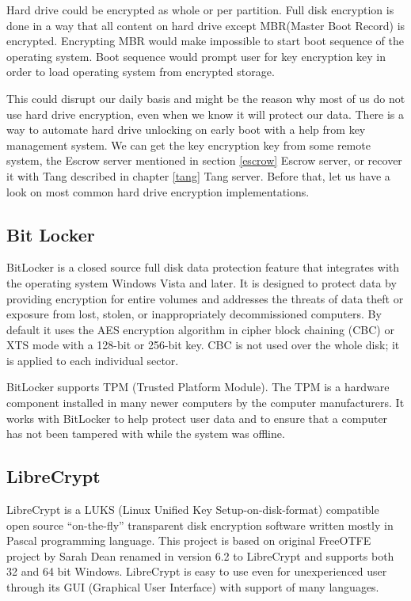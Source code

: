 Hard drive could be encrypted as whole or per partition.
Full disk encryption is done in a way that all content on hard drive except MBR(Master Boot Record) is encrypted.
Encrypting MBR would make impossible to start boot sequence of the operating system.
Boot sequence would prompt user for key encryption key in order to load operating system from encrypted storage.

This could disrupt our daily basis and might be the reason why most of us do not use hard drive encryption, even when we know it will protect our data.
There is a way to automate hard drive unlocking on early boot with a help from key management system.
We can get the key encryption key from some remote system, the Escrow server mentioned in section \ref{escrow} Escrow server, or recover it with Tang described in chapter \ref{tang} Tang server.
Before that, let us have a look on most common hard drive encryption implementations.

\subsection{Bit Locker}
BitLocker is a closed source full disk data protection feature that integrates with the operating system Windows Vista and later.
It is designed to protect data by providing encryption for entire volumes and addresses the threats of data theft or exposure from lost, stolen, or inappropriately decommissioned computers.
By default it uses the AES encryption algorithm in cipher block chaining (CBC) or XTS mode with a 128-bit or 256-bit key.
CBC is not used over the whole disk; it is applied to each individual sector.

BitLocker supports TPM (Trusted Platform Module).
The TPM is a hardware component installed in many newer computers by the computer manufacturers.
It works with BitLocker to help protect user data and to ensure that a computer has not been tampered with while the system was offline\cite{bitlocker}.

\subsection{LibreCrypt}

LibreCrypt is a LUKS (Linux Unified Key Setup-on-disk-format) compatible open source “on-the-fly” transparent disk encryption software written mostly in Pascal programming language.
This project is based on original FreeOTFE project by Sarah Dean renamed in version 6.2 to LibreCrypt and supports both 32 and 64 bit Windows.
LibreCrypt is easy to use even for unexperienced user through its GUI (Graphical User Interface) with support of many languages.

